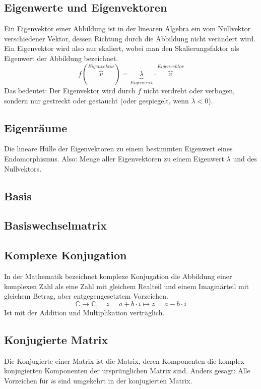 \documentclass[9pt]{article} %
\begin{document}
\subsection{Eigenwerte und Eigenvektoren}
Ein Eigenvektor einer Abbildung ist in der linearen Algebra ein vom Nullvektor verschiedener Vektor, dessen Richtung durch die Abbildung nicht verändert wird. Ein Eigenvektor wird also nur skaliert, wobei man den Skalierungsfaktor als Eigenwert der Abbildung bezeichnet.  \cite{Eigenwerte} \\
\[
f(\overbrace{v}^{Eigenvektor})=\underbrace{\lambda}_{Eigenwert} \cdot \overbrace{v}^{Eigenvektor}
\]
Das bedeutet: Der Eigenvektor wird durch $f$ nicht verdreht oder verbogen, sondern nur gestreckt oder gestaucht (oder gespiegelt, wenn $\lambda < 0$).

\subsection{Eigenräume}
Die lineare Hülle der Eigenvektoren zu einem bestimmten Eigenwert eines Endomorphismus. \cite{Eigenraum} Also: Menge aller Eigenvektoren zu einem Eigenwert $\lambda$ und des Nullvektors. 
\subsection{Basis}

\subsection{Basiswechselmatrix}

\subsection{Komplexe Konjugation}
In der Mathematik bezeichnet komplexe Konjugation die Abbildung einer komplexen Zahl als eine Zahl mit gleichem Realteil und einem Imaginärteil mit gleichem Betrag, aber entgegengesetztem Vorzeichen.
\[
\mathbb{C} \rightarrow \mathbb{C}, \quad z = a + b \cdot i \mapsto \bar z = a - b \cdot i
\]
Ist mit der Addition und Multiplikation verträglich. 
\cite{KomplexeKonjugation}
\subsection{Konjugierte Matrix}
Die Konjugierte einer Matrix ist die Matrix, deren Komponenten die komplex konjugierten Komponenten der ursprünglichen Matrix sind. \cite{KomplexeKonjugation}
Anders gesagt: Alle Vorzeichen für $i$s sind umgekehrt in der konjugierten Matrix. 
\end{document}
